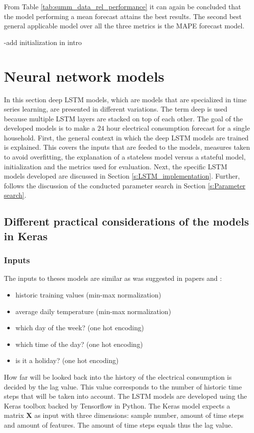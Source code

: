 From Table \ref{tab:summ_data_rel_performance} it can again be concluded that the model performing a mean forecast attains the best results. The second best general applicable model over all the three metrics is the MAPE forecast model.

-add initialization in intro
\section{Neural network models}\label{s:Neural network models}
In this section deep LSTM models, which are models that are specialized in time series learning, are presented in different variations. The term deep is used because multiple LSTM layers are stacked on top of each other. The goal of the developed models is to make a $ 24 $ hour electrical consumption forecast for a single household. First, the general context in which the deep LSTM models are trained is explained. This covers the inputs that are feeded to the models, measures taken to avoid overfitting, the explanation of a stateless model versus a stateful model, initialization and the metrics used for evaluation. Next, the specific LSTM models developed are discussed in Section \ref{s:LSTM_implementation}. Further, follows  the discussion of the conducted parameter search in Section \ref{s:Parameter search}.

\subsection{Different practical considerations of the models in Keras}

\subsubsection{Inputs}\label{s:Inputs}
The inputs to theses models are similar as was suggested in papers \cite{loadforecastingmoor} and \cite{Kong2019}: 
\begin{itemize}
	\item historic training values (min-max normalization)
	\item average daily temperature (min-max normalization)
	\item which day of the week? (one hot encoding)
	\item which time of the day? (one hot encoding)
	\item is it a holiday? (one hot encoding)
\end{itemize}

How far will be looked back into the history of the electrical consumption is decided by the lag value. This value corresponds to the number of historic time steps that will be taken into account. The LSTM models are developed using the Keras toolbox backed by Tensorflow in Python. The Keras model expects a matrix $ \bm{X} $ as input with three dimensions: sample number, amount of time steps and amount of features. The amount of time steps equals thus the lag value. 

